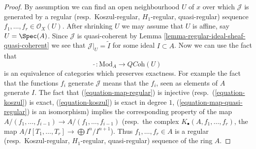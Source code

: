 \begin{proof}
By assumption we can find an open neighbourhood $U$ of $x$ over which
$\mathcal{J}$ is generated by a
regular (resp.\ Koszul-regular, $H_1$-regular, quasi-regular)
sequence $f_1, \ldots, f_r \in \mathcal{O}_X(U)$. After shrinking
$U$ we may assume that $U$ is affine, say $U = \Spec(A)$.
Since $\mathcal{J}$ is quasi-coherent by
Lemma \ref{lemma-regular-ideal-sheaf-quasi-coherent}
we see that $\mathcal{J}|_U = \widetilde{I}$ for some ideal $I \subset A$.
Now we can use the fact that
$$
\widetilde{\ } : \text{Mod}_A \longrightarrow \textit{QCoh}(U)
$$
is an equivalence of categories which preserves exactness. For example
the fact that the functions $f_i$ generate $\mathcal{J}$ means that
the $f_i$, seen as elements of $A$ generate $I$. The fact that
(\ref{equation-map-regular}) is injective
(resp.\ (\ref{equation-koszul}) is exact, (\ref{equation-koszul}) is exact
in degree $1$, (\ref{equation-map-quasi-regular}) is an isomorphism)
implies the corresponding property of the map
$A/(f_1, \ldots, f_{i - 1}) \to A/(f_1, \ldots, f_{i - 1})$
(resp.\ the complex $K_\bullet(A, f_1, \ldots, f_r)$, the
map $A/I[T_1, \ldots, T_r] \to \bigoplus I^n/I^{n + 1}$).
Thus $f_1, \ldots, f_r \in A$ is a regular
(resp.\ Koszul-regular, $H_1$-regular, quasi-regular)
sequence of the ring $A$.
\end{proof}


